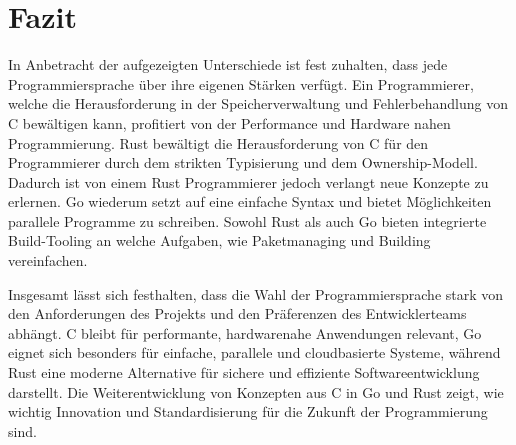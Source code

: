 \section{Fazit}
\label{sec:Fazit}

In Anbetracht der aufgezeigten Unterschiede ist fest zuhalten, dass jede
Programmiersprache über ihre eigenen Stärken verfügt. Ein Programmierer, 
welche die Herausforderung in der Speicherverwaltung und Fehlerbehandlung von C
bewältigen kann, profitiert von der Performance und Hardware nahen 
Programmierung.
Rust bewältigt die Herausforderung von C für den Programmierer durch dem strikten
Typisierung und dem Ownership-Modell. Dadurch ist von einem Rust Programmierer 
jedoch verlangt neue Konzepte zu erlernen. 
Go wiederum setzt auf eine einfache Syntax und bietet Möglichkeiten parallele
Programme zu schreiben. 
Sowohl Rust als auch Go bieten integrierte Build-Tooling an welche Aufgaben, wie
Paketmanaging und Building vereinfachen.

Insgesamt lässt sich festhalten, dass die Wahl der Programmiersprache stark von 
den Anforderungen des Projekts und den Präferenzen des Entwicklerteams abhängt. 
C bleibt für performante, hardwarenahe Anwendungen relevant, Go eignet sich 
besonders für einfache, parallele und cloudbasierte Systeme, während Rust eine 
moderne Alternative für sichere und effiziente Softwareentwicklung darstellt. 
Die Weiterentwicklung von Konzepten aus C in Go und Rust zeigt, wie wichtig 
Innovation und Standardisierung für die Zukunft der Programmierung sind.